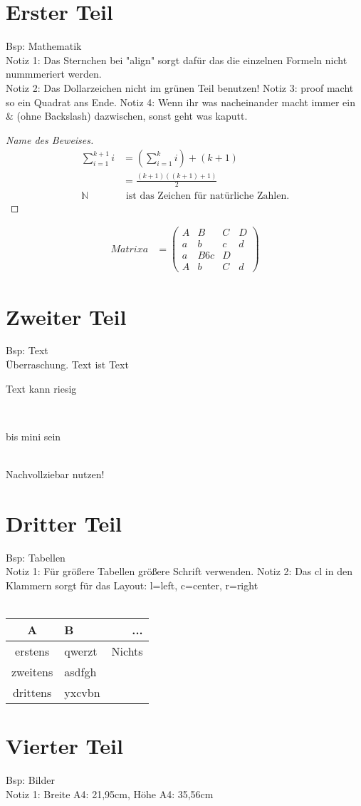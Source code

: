 \documentclass[12pt]{report}
\begin{document}
\section{Erster Teil}
Bsp: Mathematik\\
Notiz 1: Das Sternchen bei "align" sorgt dafür das die einzelnen Formeln nicht nummmeriert werden.\\
Notiz 2: Das Dollarzeichen nicht im grünen Teil benutzen!
Notiz 3: proof macht so ein Quadrat ans Ende.
Notiz 4: Wenn ihr was nacheinander macht immer ein \& (ohne Backslash) dazwischen, sonst geht was kaputt.
\begin{proof}[Name des Beweises]\begin{align*}
\sum_{i=1}^{k+1}i & = \left(\sum_{i=1}^{k}i\right) +(k+1)\\ 
& = \frac{(k+1)((k+1)+1)}{2}\\
\mathbb{N} & \text{ ist das Zeichen für natürliche Zahlen.}
\end{align*}\end{proof}

\begin{align*}
Matrixa &=
\begin{pmatrix}
	A&B&C&D\\
	a&b&c&d\\
	a&B6c&D\\
	A&b&C&d
\end{pmatrix}
\end{align*}

\section{Zweiter Teil}
Bsp: Text\\
Überraschung. Text ist Text\\
\begin{Huge} Text kann riesig \end{Huge}\\
\begin{tiny} bis mini sein \end{tiny}\\
Nachvollziebar nutzen!

\newpage	%
\section{Dritter Teil}
Bsp: Tabellen\\
Notiz 1: Für größere Tabellen größere Schrift verwenden.
Notiz 2: Das cl in den Klammern sorgt für das Layout: 
l=left, c=center, r=right\\\\

\begin{tabular}[]{clr}
	A 			& B 		& ... \\
	\hline
	erstens    	& qwerzt	& Nichts\\
	zweitens   	& asdfgh	&       \\
	drittens   	& yxcvbn
\end{tabular}

\section{Vierter Teil}
Bsp: Bilder\\
Notiz 1: Breite A4: 21,95cm, Höhe A4: 35,56cm\\
\end{document}
